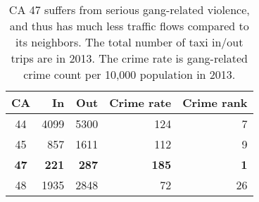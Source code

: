 \begin{table}[h]
\centering
\caption{CA 47 suffers from serious gang-related violence, and thus has much less traffic flows compared to its neighbors. The total number of taxi in/out trips are in 2013. The crime rate is gang-related crime count per 10,000 population in 2013.}
\label{tab:trip-count}
\begin{tabular}{|c|r|r|r|r|}
\hline
CA & In & Out & Crime rate & Crime rank\\ \hline
44 & 4099 & 5300 & 124 & 7\\ \hline
45 & 857 & 1611 & 112 & 9\\ \hline
\textbf{47} & \textbf{221} & \textbf{287} & \textbf{185} & \textbf{1}\\ \hline
48 & 1935 & 2848 & 72 & 26 \\ \hline
\end{tabular}
\end{table}






